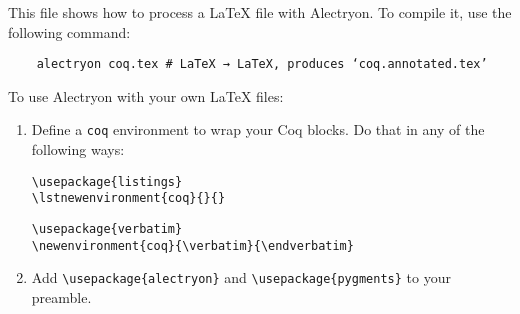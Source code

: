 \documentclass{article}
\begin{document}
This file shows how to process a LaTeX file with Alectryon.  To compile it, use the following command:

\begin{verbatim}
    alectryon coq.tex # LaTeX → LaTeX, produces ‘coq.annotated.tex’
\end{verbatim}

To use Alectryon with your own LaTeX files:

\begin{enumerate}
\item Define a \verb|coq| environment to wrap your Coq blocks.  Do that in any of the following ways:

\begin{verbatim}
\usepackage{listings}
\lstnewenvironment{coq}{}{}
\end{verbatim}

\begin{verbatim}
\usepackage{verbatim}
\newenvironment{coq}{\verbatim}{\endverbatim}
\end{verbatim}

\item Add \verb|\usepackage{alectryon}| and \verb|\usepackage{pygments}| to your preamble.
\end{enumerate}
\end{document}
